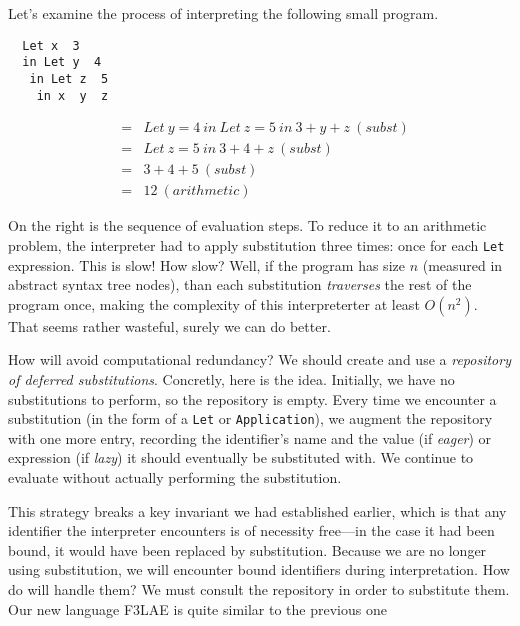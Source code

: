 \documentclass{book}
\renewcommand{\emph}[1]{{\color{blue}\textit{#1}}}
\begin{document}
Let's examine the process of interpreting the following small 
program. 

\begin{minipage}{.5\textwidth}
\begin{tabbing}\tt
~Let~x~~3~\\
\tt ~~in~Let~y~~4\\
\tt ~~~in~Let~z~~5~\\
\tt ~~~~in~x~~y~~z
\end{tabbing}
\end{minipage}%
\begin{minipage}{.5\textwidth}
\begin{eqnarray*}
& = & Let\ y = 4\ in\ Let\ z = 5\ in\ 3 + y + z\ (subst) \\ 
& = & Let\ z = 5\ in\ 3 + 4 + z\ (subst) \\
& = & 3 + 4 + 5\ (subst) \\
& = & 12\ (arithmetic)  
\end{eqnarray*}
\end{minipage}

\noindent On the right is the sequence of evaluation steps. To reduce 
it to an arithmetic problem, the interpreter had to apply substitution 
three times: once for each \texttt{Let} expression. This is slow! How slow? 
Well, if the program has size $n$ (measured in abstract syntax tree nodes), 
than each substitution \emph{traverses} the rest of the program once, making 
the complexity of this interpreterter at least $O(n^2)$. That seems rather 
wasteful, surely we can do better. 

How will avoid computational redundancy? We should create and use 
a \emph{repository of deferred substitutions}. Concretly, here 
is the idea. Initially, we have no substitutions to perform, so the 
repository is empty. Every time we encounter a substitution (in the form 
of a \texttt{Let}  or \texttt{Application}), we augment the repository 
with one more entry, recording the identifier's name and the 
value (if \emph{eager}) or expression (if \emph{lazy}) it should
eventually be substituted with. We continue to evaluate without 
actually performing the substitution. 

This strategy breaks a key invariant we had established earlier, which 
is that any identifier the interpreter encounters is of necessity 
free---in the case it had been bound, it would have been replaced 
by substitution. Because we are no longer using substitution, 
we will encounter bound identifiers during interpretation. How do 
will handle them? We must consult the repository in order to 
substitute them. Our new language \textsc{F3LAE} is quite 
similar to the previous one 
\end{document}
